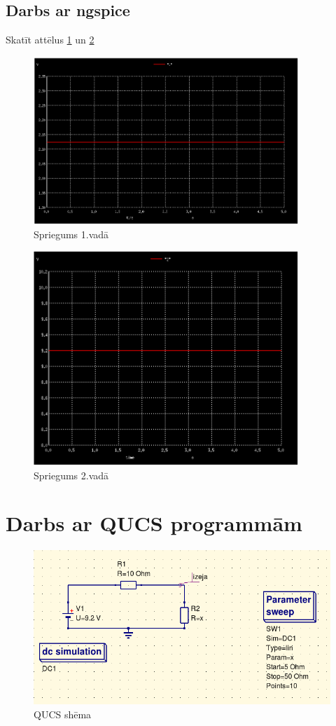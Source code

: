 \documentclass{report}
\begin{document}
\subsection{Darbs ar ngspice}
Skatīt attēlus \ref{fig:2.1} un \ref{fig:2.2} 
\begin{figure}[!h]
    \centering
    \includegraphics[width=10cm]{011.png}
    \caption{Spriegums 1.vadā}
    \label{fig:2.1}
    \end{figure}
 \begin{figure}[t]
 \centering
    \includegraphics[width=10cm]{012.png}
    \caption{Spriegums 2.vadā}
    \label{fig:2.2}
\end{figure}
\newpage

\section{Darbs ar QUCS programmām}
\begin{figure}[!h]
    \centering
    \includegraphics[width=\textwidth, height=\textheight, keepaspectratio]{QUCS.png}
    \caption{QUCS shēma}
    \label{fig:2.3}
    \end{figure}
 
\end{document}

